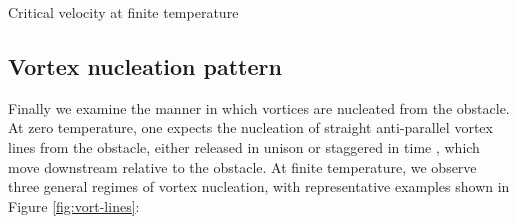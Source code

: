 \begin{chapter}{\label{cha:nonequib}Critical velocity at finite temperature}
\subsection{Vortex nucleation pattern}
Finally we examine the manner in which vortices are nucleated from the obstacle.  At zero temperature, one expects the nucleation of straight anti-parallel vortex lines from the obstacle, either released in unison or staggered in time \cite{frisch92,saito10,stagg_parker_14}, which move downstream relative to the obstacle.  At finite temperature, we observe three general regimes of vortex nucleation, with representative examples shown in Figure  \ref{fig:vort-lines}:

\begin{figure}
    \centering
\end{figure}
\end{chapter}
